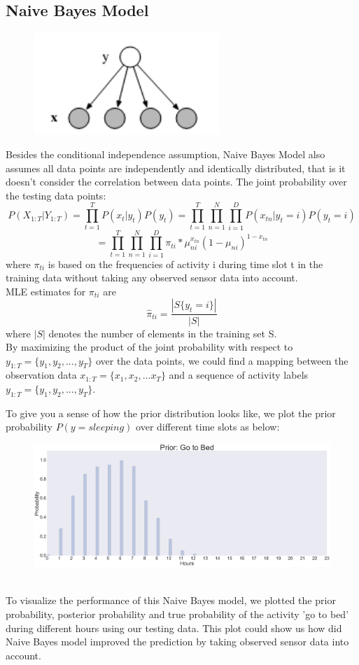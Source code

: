 \documentclass[10pt,letter]{article}
\numberwithin{equation}{section} %
\numberwithin{figure}{section} %
\numberwithin{table}{section} %
\begin{document}
\subsection{Naive Bayes Model}
\begin{figure}[h]
    \centering
\includegraphics[width=7cm]{../plot/NB}
\end{figure}
Besides the conditional independence assumption, Naive Bayes Model also assumes all data points are independently and identically distributed, that is it doesn't consider the correlation between data points. 
The joint probability over the testing data points:
$$P(X_{1:T}|Y_{1:T})= \prod_{t=1}^T P(x_t|y_t)P(y_t)= \prod_{t=1}^T\prod_{n=1}^N\prod_{i=1}^D P(x_{tn}|y_t = i)P(y_t=i)$$
$$ = \prod_{t=1}^T\prod_{n=1}^N\prod_{i=1}^D  \pi_{ti}*\mu_{ni}^{x_{tn}}(1-\mu_{ni})^{1-x_{tn}}$$
where $\pi_{ti}$ is based on the frequencies of activity i during time slot t in the training data without taking any observed sensor data into account. \\
MLE estimates for $\pi_{ti}$ are
$$\hat{\pi}_{ti} = \frac{|S\{y_t=i\}|} {|S|}$$
where $|S|$ denotes the number of elements in the training set S.\\
By maximizing the product of the joint probability with respect to $y_{1:T} = \{y_1,y_2,...,y_T\}$ over the data points, we could find a mapping between the observation data $x_{1:T} = \{x_1,x_2,...x_T\}$ and a sequence of activity labels $y_{1:T} = \{y_1,y_2,...,y_T\}$.

To give you a sense of how the prior distribution looks like, we plot the prior probability $P(y= sleeping)$ over different time slots as below: \\
\begin{figure}[h]
    \centering
    \includegraphics[width=18cm]{../plot/sleeping_prior}
\end{figure}\\
To visualize the performance of this Naive Bayes model, we plotted the prior probability, posterior probability and true probability of the activity 'go to bed' during different hours using our testing data. This plot could show us how did Naive Bayes model improved the prediction by taking observed sensor data into account.
\end{document}
